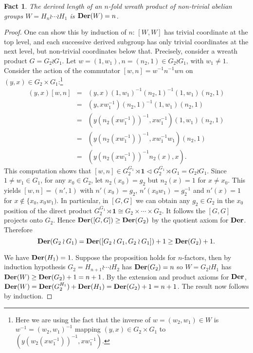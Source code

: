 \documentclass[a4paper,11pt]{amsart}
\newtheorem{fact}[theorem]{Fact}
\theoremstyle{definition}
\newcommand{\Der}{{\bf Der}}
\newcommand{\1}{{\mathbf 1}}
\begin{document}
\begin{fact} \label{DerWrAbelian}
The derived length of an $n$-fold wreath product of non-trivial abelian groups   $W= H_n \wr \cdots \wr H_1$
is  $\Der(W)=n$.
\end{fact}
\begin{proof}
 One can show this by induction of $n$: $[W,W]$ has trivial coordinate at the top level, and each successive 
derived subgroup has only trivial coordinates at the next level, but non-trivial coordinates below that.
Precisely,  consider a wreath product $G= G_2 \wr G_1$.  Let $w=(1,w_1), n=(n_2,1) \in G_2 \wr G_1$, with $w_1\neq 1$.
Consider the action of the commutator $[w, n]=w^{-1}n^{-1} w n$ on $(y,x) \in G_2 \times G_1$:\footnote{Here we are using the fact that the inverse of $w=(w_2, w_1) \in W$ is
$w^{-1}= (w_2, w_1)^{-1}$ mapping  $(y, x)\in G_2 \times G_1$ to $(y (w_2(x w_1^{-1}))^{-1}, x w_1^{-1})$.} 
\begin{eqnarray*}
(y,x)[w, n] 
& = & (y,x)(1, w_1)^{-1} (n_2, 1)^{-1}(1,w_1)(n_2, 1)\\
& = &  (y,x w_1^{-1}) (n_2, 1)^{-1}(1,w_1)(n_2, 1) \\
& = & (y (n_2(x  w_1^{-1}))^{-1}, x w_1^{-1})(1,w_1)(n_2,1)\\
& = & (y (n_2(x  w_1^{-1}))^{-1}, x w_1^{-1}w_1)(n_2,1)\\
& = & (y (n_2(x  w_1^{-1}))^{-1} n_2(x), x ).
\end{eqnarray*}
This computation shows that $[w,n]\in G_2^{G_1} \rtimes \1 \lhd G_2^{G_1} \rtimes G_1=G_2\wr G_1$. Since  $1\neq w_1 \in G_1$,
for any $x_0\in G_2$,  let $n_2(x_0)=g_2$ but $n_2(x)=1$ for $x\neq x_0$. This yields 
$[w,n] = (n', 1)$ with $n'(x_0)=g_2$, $n'(x_0 w_1)=g_2^{-1}$ and $n'(x)=1$ for $x \not\in \{x_0, x_0 w_1)$. 
In particular, in $[G,G]$ we can obtain any $g_2 \in G_2$ in the $x_0$ position of the direct product $G_2^{G_1} \rtimes \1\cong G_2 \times \cdots \times G_2$. It follows the $[G,G]$ projects onto $G_2$.   
Hence $\Der([G,G])\geq \Der(G_2)$ by the quotient axiom for $\Der$. Therefore $$\Der(G_2\wr G_1) = \Der([G_2\wr G_1,G_2\wr G_1])+1 \geq \Der(G_2)+1.$$ 

We have $\Der(H_1)=1$.  Suppose the proposition holds for $n$-factors, then by induction hypothesis
$G_2 =H_{n+1} \wr \cdots \wr H_2$ has $\Der(G_2)=n$ so $W=G_2 \wr H_1$ has $\Der(W) \geq \Der(G_2)+1=n+1$.
By the extension and product axioms for $\Der$, $\Der(W)=\Der(G_2^{H_1}) + \Der(H_1) = \Der(G_2) +1 = n+1$. 
The result now follows by induction.
\end{proof}
\end{document}

